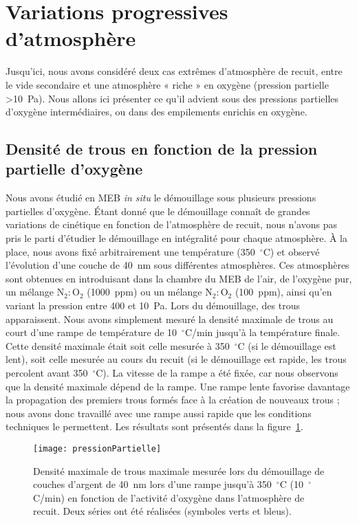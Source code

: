 \section{Variations progressives d'atmosphère}
Jusqu'ici, nous avons considéré deux cas extrêmes d'atmosphère de recuit, entre le vide secondaire et une atmosphère « riche » en oxygène (pression partielle >10~Pa). Nous allons ici présenter ce qu'il advient sous des pressions partielles d'oxygène intermédiaires, ou dans des empilements enrichis en oxygène.\par 
	\subsection{Densité de trous en fonction de la pression partielle d'oxygène}
Nous avons étudié en MEB \textit{in situ} le démouillage sous plusieurs pressions partielles d'oxygène. Étant donné que le démouillage connaît de grandes variations de cinétique en fonction de l'atmosphère de recuit, nous n'avons pas pris le parti d'étudier le démouillage en intégralité pour chaque atmosphère. À la place, nous avons fixé arbitrairement une température (350~$^\circ$C) et observé l'évolution d'une couche de 40~nm sous différentes atmosphères. Ces atmosphères sont obtenues en introduisant dans la chambre du MEB de l'air, de l'oxygène pur, un mélange N$_2:$O$_2$ (1000~ppm) ou un mélange N$_2:$O$_2$ (100~ppm), ainsi qu'en variant la pression entre 400 et 10~Pa. Lors du démouillage, des trous apparaissent. Nous avons simplement mesuré la densité maximale de trous au court d'une rampe de température de 10~$^\circ$C/min jusqu'à la température finale. Cette densité maximale était soit celle mesurée à 350~$^\circ$C (si le démouillage est lent), soit celle mesurée au cours du recuit (si le démouillage est rapide, les trous percolent avant 350~$^\circ$C). La vitesse de la rampe a été fixée, car nous observons que la densité maximale dépend de la rampe. Une rampe lente favorise davantage la propagation des premiers trous formés face à la création de nouveaux trous ; nous avons donc travaillé avec une rampe aussi rapide que les conditions techniques le permettent. Les résultats sont présentés dans la figure~\ref{pressionPartielle}.\par 
\begin{figure}[!htb]
\centering
\texttt{[image: pressionPartielle]}
\caption{Densité  maximale de trous maximale mesurée lors du démouillage de couches d'argent de 40~nm lors d'une rampe jusqu'à 350~$^\circ$C (10~$^\circ$C/min) en fonction de l'activité d'oxygène dans l'atmosphère de recuit. Deux séries ont été réalisées (symboles verts et bleus).}
\label{pressionPartielle}
\end{figure}
